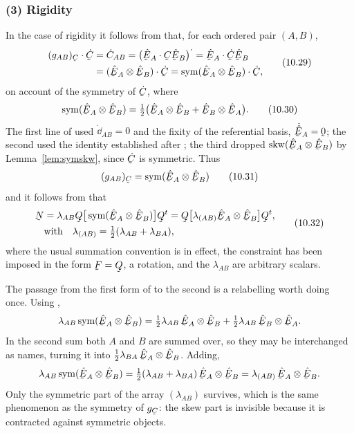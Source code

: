 \subsubsection*{(3) Rigidity}

In the case of rigidity it follows from  that, for each
ordered pair $(A,B)$,
\begin{equation}
\begin{aligned}
   (g_{AB})_{\bC}\cdot\dot\bC
   &=\dot C_{AB}=\big(\ip{\hbE_{A}}{\bC\hbE_{B}}\big)^{\textstyle\cdot}
    =\ip{\hbE_{A}}{\dot\bC\hbE_{B}}\\
   &=(\hbE_{A}\otimes\hbE_{B})\cdot\dot\bC
    =\Sym(\hbE_{A}\otimes\hbE_{B})\cdot\dot\bC ,
\end{aligned}
   \tag{10.29}\label{eq:10.29}
\end{equation}
on account of the symmetry of $\dot\bC$, where
\begin{equation}
   \Sym(\hbE_{A}\otimes\hbE_{B})
   =\tfrac12\big(\hbE_{A}\otimes\hbE_{B}+\hbE_{B}\otimes\hbE_{A}\big).
   \tag{10.30}\label{eq:10.30}
\end{equation}
The first line of  used $\dot{\dd}_{AB}=0$ and the fixity of
the referential basis, $\dot{\hbE}_{A}=\bze$; the second used the
identity established after ; the third dropped
$\Skw(\hbE_{A}\otimes\hbE_{B})$ by Lemma~\ref{lem:symskw}, since
$\dot\bC$ is symmetric. Thus
\begin{equation}
   (g_{AB})_{\bC}=\Sym(\hbE_{A}\otimes\hbE_{B})
   \tag{10.31}\label{eq:10.31}
\end{equation}
and it follows from  that
\begin{equation}
\begin{aligned}
   \bN&=\lambda_{AB}\bQ\big[\Sym(\hbE_{A}\otimes\hbE_{B})\big]\bQ^{t}
   =\bQ\big[\lambda_{(AB)}\hbE_{A}\otimes\hbE_{B}\big]\bQ^{t},\\
   &\text{with}\quad
   \lambda_{(AB)}=\tfrac12(\lambda_{AB}+\lambda_{BA}),
\end{aligned}
   \tag{10.32}\label{eq:10.32}
\end{equation}
where the usual summation convention is in effect, the constraint has
been imposed in the form $\bF=\bQ$, a rotation, and the $\lambda_{AB}$
are arbitrary scalars.

The passage from the first form of  to the second is a
relabelling worth doing once. Using ,
\[
   \lambda_{AB}\Sym(\hbE_{A}\otimes\hbE_{B})
   =\tfrac12\lambda_{AB}\,\hbE_{A}\otimes\hbE_{B}
    +\tfrac12\lambda_{AB}\,\hbE_{B}\otimes\hbE_{A}.
\]
In the second sum both $A$ and $B$ are summed over, so they may be
interchanged as names, turning it into
$\tfrac12\lambda_{BA}\,\hbE_{A}\otimes\hbE_{B}$. Adding,
\[
   \lambda_{AB}\Sym(\hbE_{A}\otimes\hbE_{B})
   =\tfrac12(\lambda_{AB}+\lambda_{BA})\,\hbE_{A}\otimes\hbE_{B}
   =\lambda_{(AB)}\,\hbE_{A}\otimes\hbE_{B}.
\]
Only the symmetric part of the array $(\lambda_{AB})$ survives, which is
the same phenomenon as the symmetry of $g_{\bC}$: the skew part is
invisible because it is contracted against symmetric objects.

